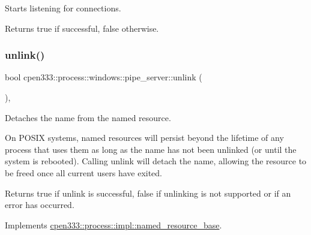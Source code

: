Starts listening for connections. 

\begin{DoxyReturn}{Returns}
true if successful, false otherwise. 
\end{DoxyReturn}
\mbox{\label{classcpen333_1_1process_1_1windows_1_1pipe__server_aa3f9fb4fd88042b09e130cd616815fe1}} 
\subsubsection{\texorpdfstring{unlink()}{unlink()}\hspace{0.1cm}{\footnotesize\ttfamily [1/2]}}
{\footnotesize\ttfamily bool cpen333\+::process\+::windows\+::pipe\+\_\+server\+::unlink (\begin{DoxyParamCaption}{ }\end{DoxyParamCaption})\hspace{0.3cm}{\ttfamily [inline]}, {\ttfamily [virtual]}}



Detaches the name from the named resource. 

On P\+O\+S\+IX systems, named resources will persist beyond the lifetime of any process that uses them as long as the name has not been unlinked (or until the system is rebooted). Calling {\ttfamily unlink} will detach the name, allowing the resource to be freed once all current users have exited.

\begin{DoxyReturn}{Returns}
{\ttfamily true} if unlink is successful, {\ttfamily false} if unlinking is not supported or if an error has occurred. 
\end{DoxyReturn}


Implements \hyperlink{classcpen333_1_1process_1_1impl_1_1named__resource__base_ae4033f82dfd068b917a9bca57d3a0c45}{cpen333\+::process\+::impl\+::named\+\_\+resource\+\_\+base}.

\mbox{\label{classcpen333_1_1process_1_1windows_1_1pipe__server_a33351b0b15900c6238d592b9642b1f68}} 
